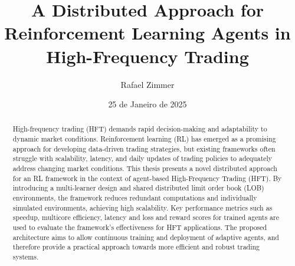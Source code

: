 \title{A Distributed Approach for Reinforcement Learning Agents in High-Frequency Trading}
\author{Rafael Zimmer}
\date{25 de Janeiro de 2025}

   
\maketitle
\begin{abstract}
  High-frequency trading (HFT) demands rapid decision-making and adaptability to dynamic market conditions. 
  Reinforcement learning (RL) has emerged as a promising approach for developing data-driven trading strategies, 
  but existing frameworks often struggle with scalability, latency, and daily updates of trading policies to adequately address changing market conditions.
  This thesis presents a novel distributed approach for an RL framework in the context of agent-based High-Frequency Trading (HFT).
  By introducing a multi-learner design and shared distributed limit order book (LOB) environments, 
  the framework reduces redundant computations and individually simulated environments, achieving high scalability. 
  Key performance metrics such as speedup, multicore efficiency, latency
  and loss and reward scores for trained agents are used to evaluate the framework's effectiveness for HFT applications.
  The proposed architecture aims to allow continuous training and deployment of adaptive agents, 
  and therefore provide a practical approach towards more efficient and robust trading systems.
\end{abstract}



